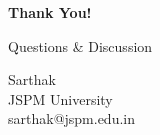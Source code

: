 \documentclass[aspectratio=169]{beamer}
\begin{document}
\begin{frame}[plain]
  \begin{center}
    \vspace{1.5cm}
    {\Huge \textcolor{vseblue}{\textbf{Thank You!}}}
    
    \vspace{1cm}
    
    {\Large Questions \& Discussion}
    
    \vspace{1.5cm}
    
    {\large Sarthak}\\
    \vspace{0.3cm}
    {\large JSPM University}\\
    \vspace{0.3cm}
    {\normalsize sarthak@jspm.edu.in}
  \end{center}
\end{frame}
\end{document}
